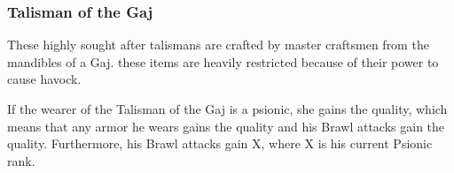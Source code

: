\begin{multicols}{2}
\subsubsection{Talisman of the Gaj} \label{itmmgc:talisman-of-the-gaj}
These highly sought after talismans are crafted by master craftsmen
from the mandibles of a Gaj. these items are heavily restricted because
of their power to cause havock.

If the wearer of the Talisman of the Gaj is a psionic, she gains
the  quality, which means that any armor he wears
gains the  quality and his Brawl attacks gain the
 quality. Furthermore, his Brawl attacks gain
 X, where X is his current Psionic rank.

\end{multicols}
\FloatBarrier

